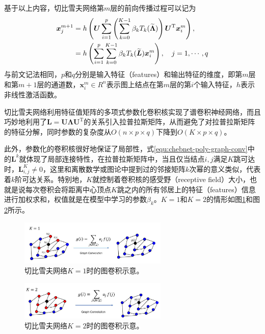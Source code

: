 \documentclass[final]{cvpr}
\begin{document}
基于以上内容，切比雪夫网络第$m$层的前向传播过程可以记为
\begin{align}
    \boldsymbol{x}_j^{m+1}
    &=
    h \left(
        \boldsymbol{U}
        \sum_{i=1}^{p}
        \left(
        \sum_{k=0}^{K-1} \beta_k
        T_k ( \widetilde{\boldsymbol{\Lambda}} )
        \right)
        \boldsymbol{U}^{\mathrm{T}}
        \boldsymbol{x}_i^{m}
    \right),  \notag \\
    &= 
    h \left(
        \sum_{i=1}^{p}
        \sum_{k=0}^{K-1} \beta_k
        T_k ( \widetilde{\boldsymbol{L}} )
        \boldsymbol{x}_i^{m}
    \right)
    ,\quad j=1,\cdots,q  \label{equ:chebnet-forward}
\end{align}
与前文记法相同，$p$和$q$分别是输入特征（features）和输出特征的维度，即第$m$层和第$m+1$层的通道数，$\boldsymbol{x}_i^{m} \in R^n$表示图上结点在第$m$层的第$i$个输入特征，$h$表示非线性激活函数。

切比雪夫网络利用特征值矩阵的多项式参数化卷积核实现了谱卷积神经网络，而且巧妙地利用了$\boldsymbol{L}=\boldsymbol{U}\boldsymbol{\Lambda}\boldsymbol{U}^{\mathrm{T}}$的关系引入拉普拉斯矩阵，从而避免了对拉普拉斯矩阵的特征分解，同时参数的复杂度从$O \left( n \times p \times q \right)$下降到$O \left( K \times p \times q \right)$。

此外，参数化的卷积核很好地保证了局部性，式\ref{equ:chebnet-poly-graph-conv}中的$\boldsymbol{L}^k$就体现了局部连接特性，在拉普拉斯矩阵中，当且仅当结点$i,j$满足$K$跳可达时，$\boldsymbol{L}_{i,j}^K \neq 0$，这里和离散数学或图论中提到过的邻接矩阵$k$次幂的意义类似，代表着$k$阶可达关系。特别地，$K$就控制着卷积核的感受野（receptive field）大小，也就是说每次卷积会将距离中心顶点$K$跳之内的所有邻居上的特征（features）信息进行加权求和，权值就是在模型中学习的参数$\beta_k$。$K=1$和$K=2$的情形如图\ref{fig:chebnet-1}和图\ref{fig:chebnet-2}所示。
\begin{figure}[htb!]
    \centering
    \includegraphics[width=0.63\textwidth]{chebnet-1.jpg}
    \caption{切比雪夫网络$K=1$时的图卷积示意。}
    \label{fig:chebnet-1}
\end{figure}
\begin{figure}[htb!]
    \centering
    \includegraphics[width=0.63\textwidth]{chebnet-2.jpg}
    \caption{切比雪夫网络$K=2$时的图卷积示意。}
    \label{fig:chebnet-2}
\end{figure}
\end{document}
